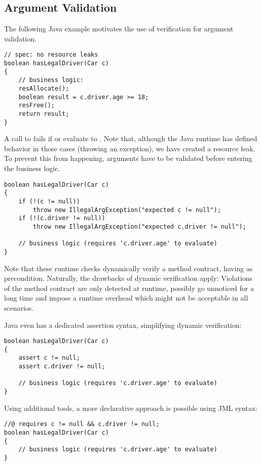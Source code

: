 
\subsection{Argument Validation}
\label{ssec:argument-validation}
The following Java example motivates the use of verification for argument validation.
\begin{lstlisting}
// spec: no resource leaks
boolean hasLegalDriver(Car c)
{
    // business logic:
    resAllocate();
    boolean result = c.driver.age >= 18;
    resFree();
    return result;
}
\end{lstlisting}
A call to  fails if  or  evaluate to .
Note that, although the Java runtime has defined behavior in those cases (throwing an exception), we have created a resource leak.
To prevent this from happening, arguments have to be validated before entering the business logic.
\begin{lstlisting}
boolean hasLegalDriver(Car c)
{
    if (!(c != null))
        throw new IllegalArgException("expected c != null");
    if (!(c.driver != null))
        throw new IllegalArgException("expected c.driver != null");
        
    // business logic (requires 'c.driver.age' to evaluate)
}
\end{lstlisting}

Note that these runtime checks dynamically verify a method contract, having  as precondition.
Naturally, the drawbacks of dynamic verification apply:
Violations of the method contract are only detected at runtime, possibly go unnoticed for a long time and impose a runtime overhead which might not be acceptable in all scenarios.

Java even has a dedicated assertion syntax, simplifying dynamic verification:
\begin{lstlisting}
boolean hasLegalDriver(Car c)
{
    assert c != null;
    assert c.driver != null;

    // business logic (requires 'c.driver.age' to evaluate)
}
\end{lstlisting}

Using additional tools, a more declarative approach is possible using JML syntax:
\begin{lstlisting}
//@ requires c != null && c.driver != null;
boolean hasLegalDriver(Car c)
{
    // business logic (requires 'c.driver.age' to evaluate)
}
\end{lstlisting}

